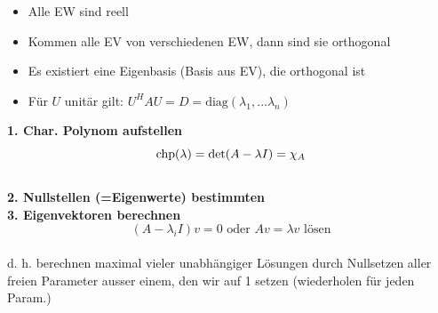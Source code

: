\documentclass[a4paper,twocolumn]{article}
\begin{document}
	\begin{feig}
		\begin{itemize}
			\item Alle EW sind reell\\[-6mm]
			\item Kommen alle EV von verschiedenen EW, dann sind sie orthogonal\\[-6mm]
			\item Es existiert eine Eigenbasis (Basis aus EV), die orthogonal ist\\[-6mm]
			\item Für $U$ unitär gilt: $U^HAU = D = \text{diag}(\lambda_1, \ldots \lambda_n)$\\[-6mm]            
		\end{itemize}
	\end{feig}
			
	\begin{fmerke}
		\textbf{1. Char. Polynom aufstellen}
			\vspace{-2mm}
			$$\text{chp}(\lambda) = \det(A-\lambda I) = \chi_A$$ \\[-6mm]
		\textbf{2. Nullstellen (=Eigenwerte) bestimmten}\\[1mm]
		\textbf{3. Eigenvektoren berechnen}
			\vspace{-2.5mm}
			$$(A-\lambda_i I)v = 0 \text{  oder  } A v = \lambda v\text{ lösen}$$\\[-8mm]
			d. h. berechnen maximal vieler unabhängiger Lösungen durch Nullsetzen aller freien Parameter ausser einem, den wir
			auf 1 setzen (wiederholen für jeden Param.)%
	\end{fmerke}
	
%	
\end{document}

